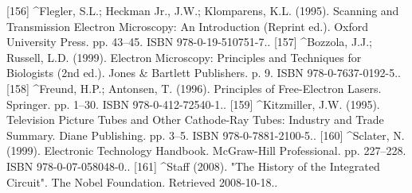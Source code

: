 [156]
^Flegler, S.L.; Heckman Jr., J.W.; Klomparens, K.L. (1995). Scanning and Transmission Electron Microscopy: An Introduction (Reprint ed.). Oxford University Press. pp. 43–45. ISBN 978-0-19-510751-7..
[157]
^Bozzola, J.J.; Russell, L.D. (1999). Electron Microscopy: Principles and Techniques for Biologists (2nd ed.). Jones & Bartlett Publishers. p. 9. ISBN 978-0-7637-0192-5..
[158]
^Freund, H.P.; Antonsen, T. (1996). Principles of Free-Electron Lasers. Springer. pp. 1–30. ISBN 978-0-412-72540-1..
[159]
^Kitzmiller, J.W. (1995). Television Picture Tubes and Other Cathode-Ray Tubes: Industry and Trade Summary. Diane Publishing. pp. 3–5. ISBN 978-0-7881-2100-5..
[160]
^Sclater, N. (1999). Electronic Technology Handbook. McGraw-Hill Professional. pp. 227–228. ISBN 978-0-07-058048-0..
[161]
^Staff (2008). "The History of the Integrated Circuit". The Nobel Foundation. Retrieved 2008-10-18..